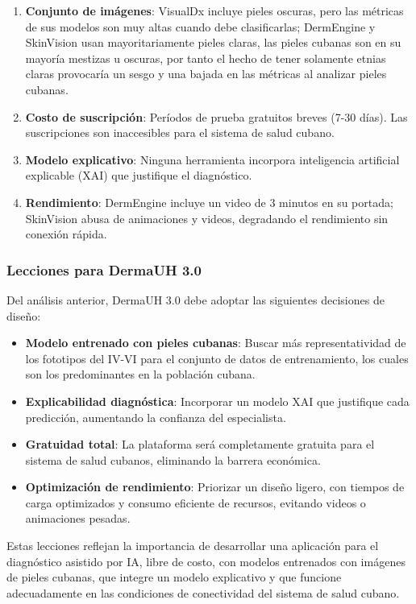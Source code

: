 \begin{enumerate}
    \item \textbf{Conjunto de imágenes}: VisualDx incluye pieles oscuras, pero las m\'etricas de sus modelos son muy altas cuando debe clasificarlas; DermEngine y SkinVision usan mayoritariamente pieles claras, las pieles cubanas son en su mayor\'ia mestizas u oscuras, por tanto el hecho de tener solamente etnias claras provocar\'ia un sesgo y una bajada en las m\'etricas al analizar pieles cubanas.
    \item \textbf{Costo de suscripción}: Períodos de prueba gratuitos breves (7-30 días). Las suscripciones son inaccesibles para el sistema de salud cubano.
    \item \textbf{Modelo explicativo}: Ninguna herramienta incorpora inteligencia artificial explicable (XAI) que justifique el diagnóstico.
    \item \textbf{Rendimiento}: DermEngine incluye un video de 3 minutos en su portada; SkinVision abusa de animaciones y videos, degradando el rendimiento sin conexión rápida.
\end{enumerate}

\subsubsection*{Lecciones para DermaUH 3.0}

Del análisis anterior, DermaUH 3.0 debe adoptar las siguientes decisiones de diseño:

\begin{itemize}
    \item \textbf{Modelo entrenado con pieles cubanas}: Buscar m\'as representatividad de los fototipos del IV-VI para el conjunto de datos de entrenamiento, los cuales son los predominantes en la poblaci\'on cubana.
    \item \textbf{Explicabilidad diagnóstica}: Incorporar un modelo XAI que justifique cada predicción, aumentando la confianza del especialista.
    \item \textbf{Gratuidad total}: La plataforma será completamente gratuita para el sistema de salud cubanos, eliminando la barrera económica.
    \item \textbf{Optimización de rendimiento}: Priorizar un diseño ligero, con tiempos de carga optimizados y consumo eficiente de recursos, evitando videos o animaciones pesadas.
\end{itemize}

Estas lecciones reflejan la importancia de desarrollar una aplicación para el diagnóstico 
asistido por IA, libre de costo, con modelos entrenados con imágenes de pieles cubanas, 
que integre un modelo explicativo y que funcione adecuadamente en las condiciones de 
conectividad del sistema de salud cubano.


